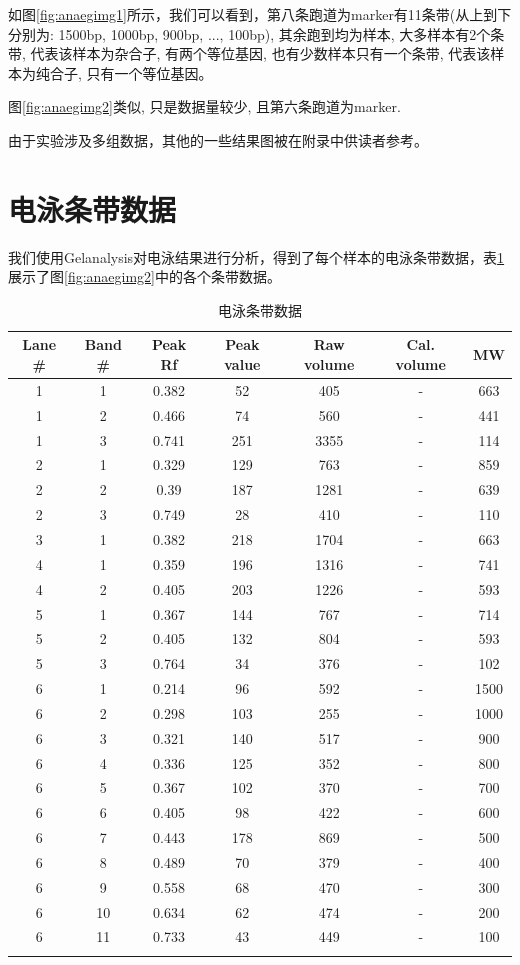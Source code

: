 \documentclass[AutoFakeBold]{LZUThesis}
\begin{document}
如图\ref{fig:anaegimg1}所示，我们可以看到，第八条跑道为marker有11条带(从上到下分别为: 1500bp, 1000bp, 900bp, ..., 100bp),
其余跑到均为样本, 大多样本有2个条带, 代表该样本为杂合子, 有两个等位基因, 也有少数样本只有一个条带, 代表该样本为纯合子, 只有一个等位基因。

图\ref{fig:anaegimg2}类似, 只是数据量较少, 且第六条跑道为marker.

由于实验涉及多组数据，其他的一些结果图被在附录中供读者参考。
\section{电泳条带数据}
我们使用Gelanalysis对电泳结果进行分析，得到了每个样本的电泳条带数据，表\ref{tab:anadataeg}展示了图\ref{fig:anaegimg2}中的各个条带数据。

\begin{longtable}{ccccccc}
    \hline
    Lane \# & Band \# & Peak Rf & Peak value & Raw volume & Cal. volume & MW \\
    \hline
    \endhead
    1 & 1 & 0.382 & 52 & 405 & - & 663 \\
    1 & 2 & 0.466 & 74 & 560 & - & 441 \\
    1 & 3 & 0.741 & 251 & 3355 & - & 114 \\
    2 & 1 & 0.329 & 129 & 763 & - & 859 \\
    2 & 2 & 0.39 & 187 & 1281 & - & 639 \\
    2 & 3 & 0.749 & 28 & 410 & - & 110 \\
    3 & 1 & 0.382 & 218 & 1704 & - & 663 \\
    4 & 1 & 0.359 & 196 & 1316 & - & 741 \\
    4 & 2 & 0.405 & 203 & 1226 & - & 593 \\
    5 & 1 & 0.367 & 144 & 767 & - & 714 \\
    5 & 2 & 0.405 & 132 & 804 & - & 593 \\
    5 & 3 & 0.764 & 34 & 376 & - & 102 \\
    6 & 1 & 0.214 & 96 & 592 & - & 1500 \\
    6 & 2 & 0.298 & 103 & 255 & - & 1000 \\
    6 & 3 & 0.321 & 140 & 517 & - & 900 \\
    6 & 4 & 0.336 & 125 & 352 & - & 800 \\
    6 & 5 & 0.367 & 102 & 370 & - & 700 \\
    6 & 6 & 0.405 & 98 & 422 & - & 600 \\
    6 & 7 & 0.443 & 178 & 869 & - & 500 \\
    6 & 8 & 0.489 & 70 & 379 & - & 400 \\
    6 & 9 & 0.558 & 68 & 470 & - & 300 \\
    6 & 10 & 0.634 & 62 & 474 & - & 200 \\
    6 & 11 & 0.733 & 43 & 449 & - & 100 \\
    \hline
    \caption{电泳条带数据}
    \label{tab:anadataeg} \\
\end{longtable}
\end{document}
